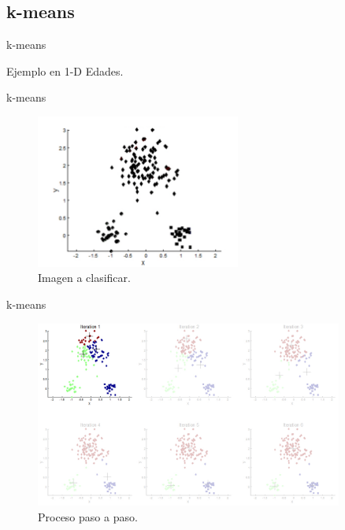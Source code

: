 \documentclass[handout,draft]{beamer}
\begin{document}
\subsection{k-means}
\begin{frame}{k-means}
  \begin{exampleblock}{Ejemplo en 1-D}
    Edades.
  \end{exampleblock}
\end{frame}

\begin{frame}{k-means}
  \begin{figure}
    \includegraphics[width=0.6\textwidth]{imagenes/byn.png}
    \caption{Imagen a clasificar.}
  \end{figure}
\end{frame}

\begin{frame}{k-means}
  \begin{figure}
    \includegraphics[width=0.9\textwidth]{imagenes/step1.png}
    \caption{Proceso paso a paso.}
  \end{figure}
\end{frame}
\end{document}
